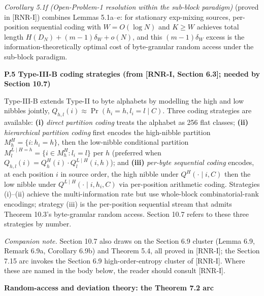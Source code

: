 \documentclass[
]{article}
\begin{document}
\emph{Corollary 5.1f (Open-Problem-1 resolution within the sub-block
paradigm)} (proved in [RNR-I]) combines Lemmas 5.1a--e: for stationary
exp-mixing sources, per-position sequential coding with $W = O(\log N)$ and
$K \ge W$ achieves total length $H(D_N) + (m-1)\delta_W + o(N)$, and this
$(m-1)\delta_W$ excess is the information-theoretically optimal cost of
byte-granular random access under the sub-block paradigm.

\textbf{P.5 Type-III-B coding strategies (from [RNR-I, Section 6.3];
needed by Section 10.7)}

Type-III-B extends Type-II to byte alphabets by modelling the high and low
nibbles jointly, $Q_{h,l}(i) \approx \Pr(h_i=h, l_i=l \mid C)$. Three
coding strategies are available: \textbf{(i)} \emph{direct partition
coding} treats the alphabet as 256 flat classes; \textbf{(ii)}
\emph{hierarchical partition coding} first encodes the high-nibble
partition $M^H_h = \{i : h_i = h\}$, then the low-nibble conditional
partition $M^{L\mid H=h}_l = \{i \in M^H_h : l_i = l\}$ per $h$ (preferred
when $Q_{h,l}(i) = Q^H_h(i)\cdot Q^{L\mid H}_l(i,h)$); and \textbf{(iii)}
\emph{per-byte sequential coding} encodes, at each position $i$ in source
order, the high nibble under $Q^H(\cdot\mid i,C)$ then the low nibble under
$Q^{L\mid H}(\cdot\mid i, h_i, C)$ via per-position arithmetic coding.
Strategies (i)--(ii) achieve the multi-information rate but use whole-block
combinatorial-rank encodings; strategy (iii) is the per-position sequential
stream that admits Theorem 10.3's byte-granular random access. Section 10.7
refers to these three strategies by number.

\emph{Companion note.} Section 10.7 also draws on the Section 6.9 cluster
(Lemma 6.9, Remark 6.9a, Corollary 6.9b) and Theorem 5.4, all proved in
[RNR-I]; the Section 7.15 arc invokes the Section 6.9 high-order-entropy
cluster of [RNR-I]. Where these are named in the body below, the reader
should consult [RNR-I].

\textbf{Random-access and deviation theory: the Theorem 7.2 arc}
\end{document}
